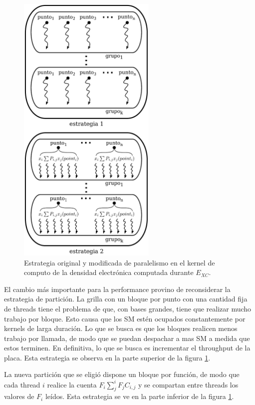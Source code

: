 \begin{figure}[htbp]
   \centering
   \includegraphics[width=250px]{images/cuda-parallelism.pdf}
   \caption{Estrategia original y modificada de paralelismo en el kernel de computo de la densidad
   electr\'onica computada durante $E_{XC}$.}
   \label{fig:cuda-xc-parallelism}
\end{figure}

El cambio m\'as importante para la performance provino de reconsiderar
la estrategia de partici\'on. La grilla con un bloque por punto con una cantidad
fija de threads tiene el problema de que, con bases grandes, tiene que realizar
mucho trabajo por bloque. Esto causa que los SM est\'en ocupados constantemente
por kernels de larga duraci\'on. Lo que se busca es que los  bloques realicen
menos trabajo por llamada, de modo que se puedan despachar a mas SM a medida
que estos terminen. En definitiva, lo que se busca es incrementar el throughput
de la placa. Esta estrategia se observa en la parte superior de la figura
\ref{fig:cuda-xc-parallelism}.

La nueva partici\'on que se eligi\'o dispone un bloque por funci\'on,
de modo que cada thread $i$ realice la cuenta $F_i \sum_{j}^{i} F_j C_{i,j}$
y se compartan entre threads los valores de $F_i$ le\'idos.
Esta estrategia se ve en la parte inferior de la figura \ref{fig:cuda-xc-parallelism}.

